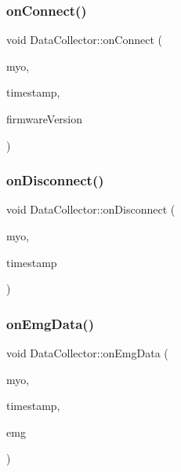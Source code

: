 \mbox{\label{class_data_collector_a8e6ee72005537474eb45f2a9310fa540}} 
\subsubsection{\texorpdfstring{on\+Connect()}{onConnect()}}
{\footnotesize\ttfamily void Data\+Collector\+::on\+Connect (\begin{DoxyParamCaption}\item[{myo\+::\+Myo $\ast$}]{myo,  }\item[{uint64\+\_\+t}]{timestamp,  }\item[{myo\+::\+Firmware\+Version}]{firmware\+Version }\end{DoxyParamCaption})}

\mbox{\label{class_data_collector_a89d1d780cdf635c607707f90b0665d50}} 
\subsubsection{\texorpdfstring{on\+Disconnect()}{onDisconnect()}}
{\footnotesize\ttfamily void Data\+Collector\+::on\+Disconnect (\begin{DoxyParamCaption}\item[{myo\+::\+Myo $\ast$}]{myo,  }\item[{uint64\+\_\+t}]{timestamp }\end{DoxyParamCaption})}

\mbox{\label{class_data_collector_a43639de09ccb9c540a3d21d267e7460a}} 
\subsubsection{\texorpdfstring{on\+Emg\+Data()}{onEmgData()}}
{\footnotesize\ttfamily void Data\+Collector\+::on\+Emg\+Data (\begin{DoxyParamCaption}\item[{myo\+::\+Myo $\ast$}]{myo,  }\item[{uint64\+\_\+t}]{timestamp,  }\item[{const int8\+\_\+t $\ast$}]{emg }\end{DoxyParamCaption})}

